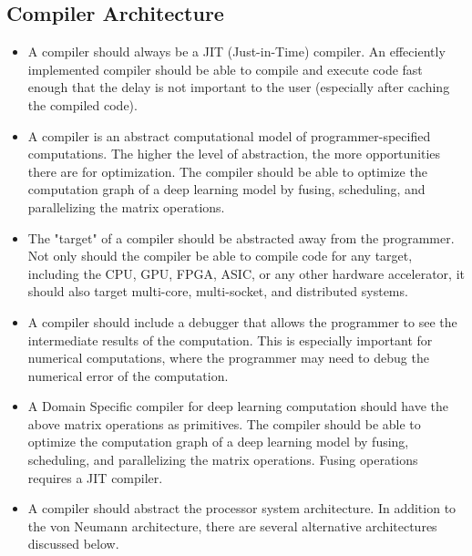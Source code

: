 \documentclass{article}
\begin{document}
\subsection{Compiler Architecture}

\begin{itemize}
    \item A compiler should always be a JIT (Just-in-Time) compiler. An effeciently implemented compiler should be able to compile and execute code fast enough that the delay is not important to the user (especially after caching the compiled code).
    \item A compiler is an abstract computational model of programmer-specified computations. The higher the level of abstraction, the more opportunities there are for optimization. The compiler should be able to optimize the computation graph of a deep learning model by fusing, scheduling, and parallelizing the matrix operations.
    \item The "target" of a compiler should be abstracted away from the programmer. Not only should the compiler be able to compile code for any target, including the CPU, GPU, FPGA, ASIC, or any other hardware accelerator, it should also target multi-core, multi-socket, and distributed systems.
    \item A compiler should include a debugger that allows the programmer to see the intermediate results of the computation. This is especially important for numerical computations, where the programmer may need to debug the numerical error of the computation.
    \item A Domain Specific compiler for deep learning computation should have the above matrix operations as primitives. The compiler should be able to optimize the computation graph of a deep learning model by fusing, scheduling, and parallelizing the matrix operations. Fusing operations requires a JIT compiler.
    \item A compiler should abstract the processor system architecture. In addition to the von Neumann architecture, there are several alternative architectures discussed below.
\end{itemize}
\end{document}
